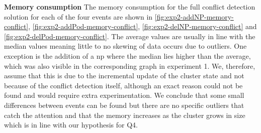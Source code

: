 \textbf{Memory consumption}
\newline The memory consumption for the full conflict detection solution for each of the four events are shown in \autoref{fig:exp2-addNP-memory-conflict}, \autoref{fig:exp2-addPod-memory-conflict}, \autoref{fig:exp2-delNP-memory-conflict} and \autoref{fig:exp2-delPod-memory-conflict}. The average values are usually in line with the median values meaning little to no skewing of data occurs due to outliers. One exception is the addition of a \acrshort{np} where the median lies higher than the average, which was also visible in the corresponding graph in experiment 1. We, therefore, assume that this is due to the incremental update of the cluster state and not because of the conflict detection itself, although an exact reason could not be found and would require extra experimentation. We conclude that some small differences between events can be found but there are no specific outliers that catch the attention and that the memory increases as the cluster grows in size which is in line with our hypothesis for Q4.

